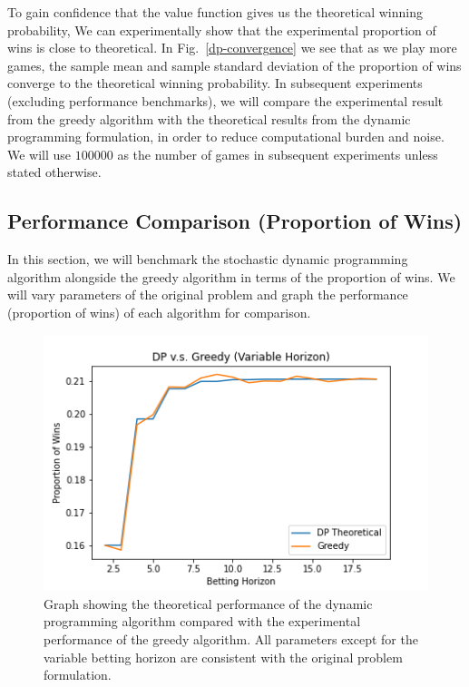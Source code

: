 \documentclass[conference]{IEEEtran}
\begin{document}
To gain confidence that the value function gives us the theoretical winning probability, We can experimentally show that the experimental proportion of wins is close to theoretical. In Fig.~\ref{dp-convergence} we see that as we play more games, the sample mean and sample standard deviation of the proportion of wins converge to the theoretical winning probability. In subsequent experiments (excluding performance benchmarks), we will compare the experimental result from the greedy algorithm with the theoretical results from the dynamic programming formulation, in order to reduce computational burden and noise. We will use $100000$ as the number of games in subsequent experiments unless stated otherwise.

\subsection{Performance Comparison (Proportion of Wins)}

In this section, we will benchmark the stochastic dynamic programming algorithm alongside the greedy algorithm in terms of the proportion of wins. We will vary parameters of the original problem and graph the performance (proportion of wins) of each algorithm for comparison.

\begin{figure}[htbp]
\includegraphics[width=\columnwidth]{dp-vs-greedy-variable-horizon.png}
\caption{Graph showing the theoretical performance of the dynamic programming algorithm compared with the experimental performance of the greedy algorithm. All parameters except for the variable betting horizon are consistent with the original problem formulation.}
\label{dp-vs-greedy-variable-horizon}
\end{figure}
\end{document}
